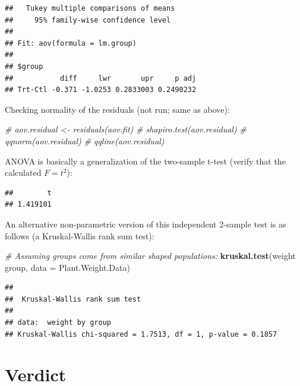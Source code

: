 \documentclass[
]{book}
\newenvironment{Shaded}{\begin{snugshade}}{\end{snugshade}}
\newcommand{\CommentTok}[1]{\textcolor[rgb]{0.56,0.35,0.01}{\textit{#1}}}
\newcommand{\DataTypeTok}[1]{\textcolor[rgb]{0.13,0.29,0.53}{#1}}
\newcommand{\DecValTok}[1]{\textcolor[rgb]{0.00,0.00,0.81}{#1}}
\newcommand{\KeywordTok}[1]{\textcolor[rgb]{0.13,0.29,0.53}{\textbf{#1}}}
\newcommand{\NormalTok}[1]{#1}
\newcommand{\OperatorTok}[1]{\textcolor[rgb]{0.81,0.36,0.00}{\textbf{#1}}}
\newcommand{\StringTok}[1]{\textcolor[rgb]{0.31,0.60,0.02}{#1}}
\begin{document}
\begin{verbatim}
##   Tukey multiple comparisons of means
##     95% family-wise confidence level
## 
## Fit: aov(formula = lm.group)
## 
## $group
##           diff     lwr       upr     p adj
## Trt-Ctl -0.371 -1.0253 0.2833003 0.2490232
\end{verbatim}

Checking normality of the residuals (not run; same as above):

\begin{Shaded}
\begin{Highlighting}[]
\CommentTok{# aov.residual <- residuals(aov.fit)}
\CommentTok{# shapiro.test(aov.residual)}
\CommentTok{# qqnorm(aov.residual)}
\CommentTok{# qqline(aov.residual)}
\end{Highlighting}
\end{Shaded}

ANOVA is basically a generalization of the two-sample t-test (verify that the calculated \(F = t^2\)):

\begin{Shaded}
\end{Shaded}

\begin{verbatim}
##        t 
## 1.419101
\end{verbatim}

An alternative non-parametric version of this independent 2-sample test is as follows (a Kruskal-Wallis rank sum test):

\begin{Shaded}
\begin{Highlighting}[]
\CommentTok{# Assuming groups come from similar shaped populations:}
\KeywordTok{kruskal.test}\NormalTok{(weight }\OperatorTok{~}\StringTok{ }\NormalTok{group, }\DataTypeTok{data =}\NormalTok{ Plant.Weight.Data) }
\end{Highlighting}
\end{Shaded}

\begin{verbatim}
## 
## 	Kruskal-Wallis rank sum test
## 
## data:  weight by group
## Kruskal-Wallis chi-squared = 1.7513, df = 1, p-value = 0.1857
\end{verbatim}

\hypertarget{verdict}{%
\section{Verdict}\label{verdict}}
\end{document}

